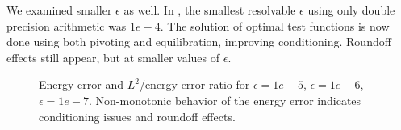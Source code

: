 \documentclass[11pt,onecolumn]{scrartcl}
\begin{document}
We examined smaller $\epsilon$ as well. In \cite{DPGrobustness}, the smallest resolvable $\epsilon$ using only double precision arithmetic was $1e-4$. The solution of optimal test functions is now done using both pivoting and equilibration, improving conditioning. Roundoff effects still appear, but at smaller values of $\epsilon$.

\begin{figure}[h!]
\centering
{}
\caption{Energy error and $L^2$/energy error ratio for $\epsilon=1e-5$, $\epsilon=1e-6$, $\epsilon=1e-7$. Non-monotonic behavior of the energy error indicates conditioning issues and roundoff effects.}
\label{roundoff_figures}
\end{figure}
\end{document}
